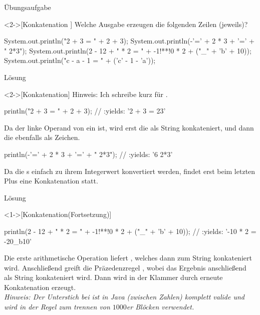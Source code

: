 \begin{frame}[c,fragile]{Übungsaufgabe}
    \begin{exercise}<2->[Konkatenation ]
        \pause{}Welche Ausgabe erzeugen die folgenden Zeilen (jeweils)?\pause{}
        \begin{plainjava}
System.out.println("2 + 3 = " + 2 + 3);
System.out.println(-'=' + 2 * 3 + '=' + " 2*3");
System.out.println(2 - 12 + " * 2 = " + -1!**!0 * 2 + ("_" + 'b' + 10));
System.out.println("c - a - 1 = " + ('c' - 1 - 'a'));
        \end{plainjava}
    \end{exercise}
\end{frame}

\begin{frame}[c,fragile]{Lösung}
    \begin{solve}<2->[Konkatenation]
        \pause{}Hinweis: Ich schreibe  kurz für . \pause{}
\begin{plainjava}
println("2 + 3 = " + 2 + 3); // :yields: '2 + 3 = 23'
\end{plainjava}
    \pause{}Da der linke Operand von \bjava{+} ein  ist,\pause{} wird erst die  als String konkateniert,\pause{} und dann die  ebenfalls als Zeichen.\pause{}
\begin{plainjava}
println(-'=' + 2 * 3 + '=' + " 2*3"); // :yields: '6 2*3'
\end{plainjava}
    \pause{}Da die s einfach zu ihrem Integerwert konvertiert werden,\pause{} findet erst beim letzten Plus eine Konkatenation statt.
    \end{solve}
\end{frame}

\begin{frame}[c,fragile]{Lösung}
    \addtocounter{solve}{-1}
    \begin{solve}<1->[Konkatenation\hfill(Fortsetzung)]
\pause{}
\begin{plainjava}
println(2 - 12 + " * 2 = " + -1!**!0 * 2 + ("_" + 'b' + 10));
    // :yields: '-10 * 2 = -20_b10'
\end{plainjava}
    \pause{}Die erste arithmetische Operation liefert ,\pause{} welches dann zum String konkateniert wird.\pause{} Anschließend greift die Präzedenzregel ,\pause{} wobei das Ergebnis anschließend als String konkateniert wird.\pause{} Dann wird in der Klammer durch erneute Konkatenation  erzeugt.\pause{}\\
    \textit{Hinweis: Der Unterstich bei  ist in Java (zwischen Zahlen) komplett valide\pause{} und wird in der Regel zum trennen von \(1000\)er Blöcken verwendet.}
    \end{solve}
\end{frame}

